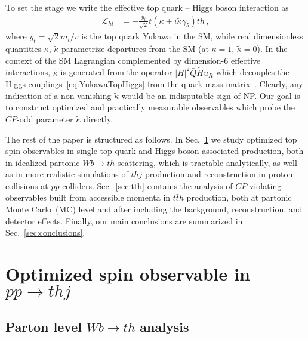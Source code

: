 \documentclass[11pt,a4paper]{article}
\newcommand{\lagr}{\mathcal{L}}
\begin{document}
To set the stage we write the effective top quark -- Higgs boson interaction as
\begin{equation}
\label{eq:YukawaTopHiggs}
\begin{split}   
\lagr_{ht} &= -\frac{y_t}{\sqrt{2}} \bar t(\kappa  + i \tilde{\kappa} \gamma_5) t h\,,
\end{split}
\end{equation} 
where $y_t = \sqrt{2} m_t/v$ is the top quark Yukawa in the SM, while
real dimensionless quantities $\kappa$, $\tilde \kappa$ parametrize
departures from the SM (at $\kappa =1$, $\tilde{\kappa} =0$). In the
context of the SM Lagrangian complemented by dimension-6 effective
interactions, $\tilde \kappa$ is generated from the operator
$|H|^2 \bar Q \tilde H u_R$ which decouples the Higgs couplings~\eqref{eq:YukawaTopHiggs} from
the quark mass matrix~\cite{AguilarSaavedra:2009mx}. Clearly, any
indication of a non-vanishing $\tilde{\kappa}$ would be an
indisputable sign of NP.  Our goal is to construct optimized and
practically measurable observables which probe the $CP$-odd parameter
$\tilde{\kappa}$ directly.

The rest of the paper is structured as follows. In Sec.~\ref{sec:thj} we study optimized top spin observables in single top quark and Higgs boson associated production, both in idealized partonic $Wb \to th$ scattering, which is tractable analytically, as well as in more realistic simulations of $thj$ production and reconstruction in proton collisions at $pp$ colliders. Sec.~\ref{sec:tth} contains the analysis of $CP$ violating observables built from accessible momenta in $t\bar t h$ production, both at partonic Monte Carlo~(MC) level and after including the background, reconstruction, and detector effects. Finally, our main conclusions are summarized in Sec.~\ref{sec:conclusions}.


%
\section{Optimized spin observable in $pp \to t h j$}\label{sec:thj}
%


\subsection{Parton level $Wb \to th$ analysis}
\end{document}
